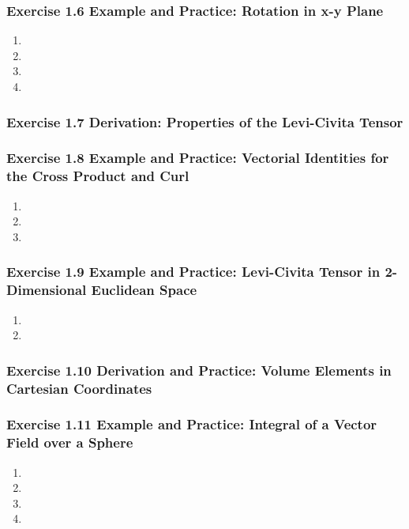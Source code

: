 \documentclass[10pt,a4paper]{article}
\theoremstyle{definition}
\begin{document}
\subsubsection{Exercise 1.6 Example and Practice: Rotation in x-y Plane}
\begin{enumerate}[label=(\alph*)]
\item
\item
\item
\item
\end{enumerate}

\subsubsection{Exercise 1.7 Derivation: Properties of the Levi-Civita Tensor}

\subsubsection{Exercise 1.8 Example and Practice: Vectorial Identities for the Cross Product
and Curl}
\begin{enumerate}[label=(\alph*)]
\item
\item
\item
\end{enumerate}

\subsubsection{Exercise 1.9 Example and Practice: Levi-Civita Tensor in 2-Dimensional Euclidean Space}
\begin{enumerate}[label=(\alph*)]
\item
\item
\end{enumerate}

\subsubsection{Exercise 1.10 Derivation and Practice: Volume Elements in Cartesian Coordinates}

\subsubsection{Exercise 1.11 Example and Practice: Integral of a Vector Field over a Sphere}
\begin{enumerate}[label=(\alph*)]
\item
\item
\item
\item
\end{enumerate}
\end{document}
